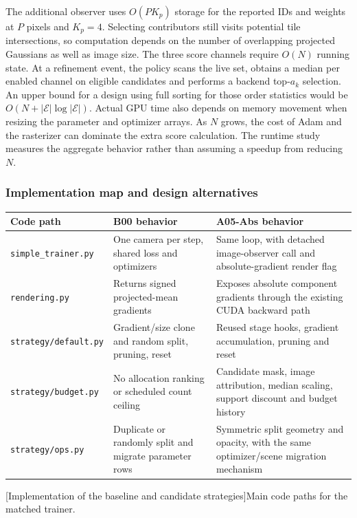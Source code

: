 The additional observer uses $O(PK_p)$ storage for the reported IDs and weights at $P$ pixels and $K_p=4$. Selecting contributors still visits potential tile intersections, so computation depends on the number of overlapping projected Gaussians as well as image size. The three score channels require $O(N)$ running state. At a refinement event, the policy scans the live set, obtains a median per enabled channel on eligible candidates and performs a backend top-$a_k$ selection. An upper bound for a design using full sorting for those order statistics would be $O(N+|\mathcal E|\log|\mathcal E|)$. Actual GPU time also depends on memory movement when resizing the parameter and optimizer arrays. As $N$ grows, the cost of Adam and the rasterizer can dominate the extra score calculation. The runtime study measures the aggregate behavior rather than assuming a speedup from reducing $N$.

\subsubsection{Implementation map and design alternatives}
\begin{center}\begin{minipage}{\linewidth}
\small\begin{tabularx}{\linewidth}{@{}p{.25\linewidth}YY@{}}
\toprule
\textbf{Code path} & \textbf{B00 behavior} & \textbf{A05-Abs behavior}\\
\midrule
\texttt{simple\_trainer.py} & One camera per step, shared loss and optimizers & Same loop, with detached image-observer call and absolute-gradient render flag\\
\texttt{rendering.py} & Returns signed projected-mean gradients & Exposes absolute component gradients through the existing CUDA backward path\\
\texttt{strategy/default.py} & Gradient/size clone and random split, pruning, reset & Reused stage hooks, gradient accumulation, pruning and reset\\
\texttt{strategy/budget.py} & No allocation ranking or scheduled count ceiling & Candidate mask, image attribution, median scaling, support discount and budget history\\
\texttt{strategy/ops.py} & Duplicate or randomly split and migrate parameter rows & Symmetric split geometry and opacity, with the same optimizer/scene migration mechanism\\
\bottomrule
\end{tabularx}\par
{}[Implementation of the baseline and candidate strategies]{Main code paths for the matched trainer.}\label{tab:code}
\end{minipage}\end{center}


